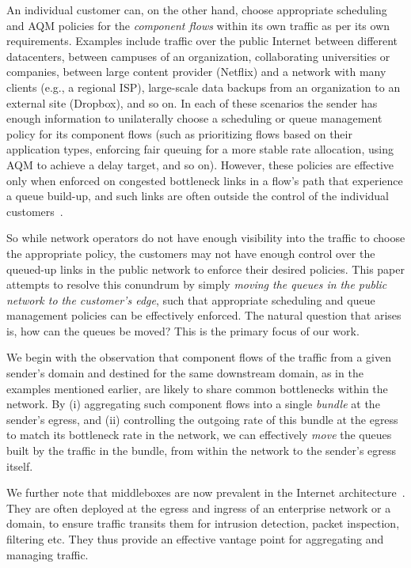 An individual customer can, on the other hand, choose appropriate scheduling and AQM policies for the \emph{component flows} within its own traffic as per its own requirements. 
Examples include traffic over the public Internet between different datacenters, between campuses of an organization, collaborating universities or companies, between large content provider (\eg Netflix) and a network with many clients (e.g., a regional ISP), large-scale data backups from an organization to an external site (\eg Dropbox), and so on. 
In each of these scenarios the sender has enough information to unilaterally choose a scheduling or queue management policy for its component flows (such as prioritizing flows based on their application types, enforcing fair queuing for a more stable rate allocation, using AQM to achieve a delay target, and so on). However, these policies are effective only when enforced on congested bottleneck links in a flow's path that experience a queue build-up, and such links are often outside the control of the individual customers~\cite{inferring-interdomain-congestion}. 

So while network operators do not have enough visibility into the traffic to choose the appropriate policy, the customers may not have enough control over the queued-up links in the public network to enforce their desired policies. This paper attempts to resolve this conundrum by simply \emph{moving the queues in the public network to the customer's edge}, such that appropriate scheduling and queue management policies can be effectively enforced. The natural question that arises is, how can the queues be moved? This is the primary focus of our work. 

We begin with the observation that component flows of the traffic from a given sender's domain and destined for the same downstream domain, as in the examples mentioned earlier, are likely to share common bottlenecks within the network. By (i) aggregating such component flows into a single \emph{bundle} at the sender's egress, and (ii) controlling the outgoing rate of this bundle at the egress to match its bottleneck rate in the network, we can effectively \emph{move} the queues built by the traffic in the bundle, from within the network to the sender's egress itself.  

We further note that middleboxes are now prevalent in the Internet architecture~\cite{aplomb}. They are often deployed at the egress and ingress of an enterprise network or a domain, to ensure traffic transits them for intrusion detection, packet inspection, filtering etc. They thus provide an effective vantage point for aggregating and managing traffic. 


